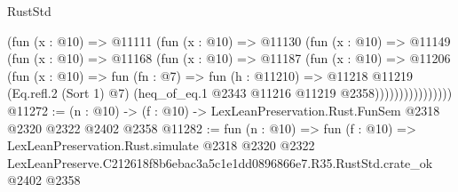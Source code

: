 \begin{lexlean}{RustStd}
\begin{coremodule}
                    (fun (x : @10) =>
                    @11111
                      (fun (x : @10) =>
                      @11130
                        (fun (x : @10) =>
                        @11149
                          (fun (x : @10) =>
                          @11168
                            (fun (x : @10) =>
                            @11187
                              (fun (x : @10) =>
                              @11206
                                (fun (x : @10) =>
                                fun (fn : @7) =>
                                fun (h : @11210) =>
                                @11218
                                  @11219
                                  (Eq.refl.{2} (Sort 1) @7)
                                  (heq_of_eq.{1} @2343 @11216 @11219 @2358))))))))))))))))
@11272 := (n : @10) -> (f : @10) -> LexLeanPreservation.Rust.FunSem @2318 @2320 @2322 @2402 @2358
@11282 := fun (n : @10) =>
  fun (f : @10) =>
  LexLeanPreservation.Rust.simulate
    @2318
    @2320
    @2322
    LexLeanPreserve.C212618f8b6ebac3a5c1e1dd0896866e7.R35.RustStd.crate_ok
    @2402
    @2358
\end{coremodule}
\end{lexlean}

